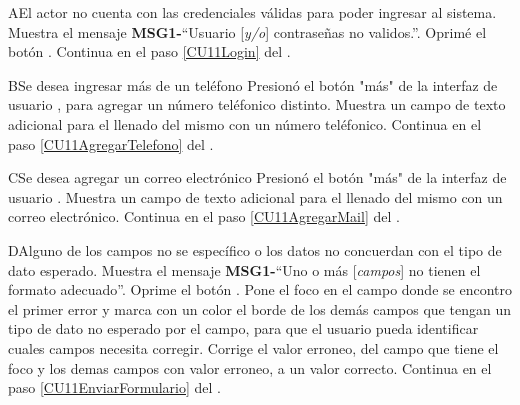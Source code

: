 		\begin{UCtrayectoriaA}{A}{El actor no cuenta con las credenciales válidas para poder ingresar al sistema.}
			\UCpaso Muestra el mensaje {\bf MSG1-}``Usuario [{\em y/o}] contraseñas no validos.''.
			\UCpaso[\UCactor] Oprimé el botón .
			\UCpaso Continua en el paso \ref{CU11Login} del .
		\end{UCtrayectoriaA}
		
		\begin{UCtrayectoriaA}{B}{Se desea ingresar más de un teléfono}
			\UCpaso[\UCactor] Presionó el botón "más" de la interfaz de usuario , para agregar un número teléfonico distinto.
			\UCpaso Muestra un campo de texto adicional para el llenado del mismo con un número teléfonico.
			\UCpaso Continua en el paso \ref{CU11AgregarTelefono} del . 
		\end{UCtrayectoriaA}
		
		\begin{UCtrayectoriaA}{C}{Se desea agregar un correo electrónico}
			\UCpaso[\UCactor] Presionó el botón "más" de la interfaz de usuario .
			\UCpaso Muestra un campo de texto adicional para el llenado del mismo con un correo electrónico.
			\UCpaso Continua en el paso \ref{CU11AgregarMail} del . 
		\end{UCtrayectoriaA}		
		
		\begin{UCtrayectoriaA}{D}{Alguno de los campos no se específico o los datos no concuerdan con el tipo de dato esperado.}
			\UCpaso Muestra el mensaje {\bf MSG1-}``Uno o más [{\em campos}] no tienen el formato adecuado''.
			\UCpaso[\UCactor] Oprime el botón .
			\UCpaso Pone el foco en el campo donde se encontro el primer error y marca con un color el borde de los demás campos que tengan un tipo de dato no esperado por el campo, para que el usuario pueda identificar cuales campos necesita corregir. 
			\UCpaso[\UCactor] Corrige el valor erroneo, del campo que tiene el foco y los demas campos con valor erroneo, a un valor correcto.
			\UCpaso Continua en el paso \ref{CU11EnviarFormulario} del .
		\end{UCtrayectoriaA}
		

